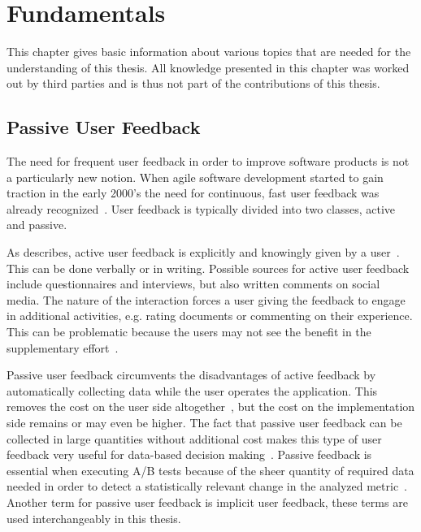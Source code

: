 %
\chapter{Fundamentals}
\label{ch:fundamentals}

This chapter gives basic information about various topics that are needed for the understanding of this thesis.
All knowledge presented in this chapter was worked out by third parties and is thus not part of the contributions of this thesis.

\section{Passive User Feedback}
\label{sec:fundamentals:implicit}

The need for frequent user feedback in order to improve software products is not a particularly new notion.
When agile software development started to gain traction in the early 2000's the need for continuous, fast user feedback was already recognized~\cite{Williams2003}.
User feedback is typically divided into two classes, active and passive.

As \citeauthor{Bosch2012} describes, active user feedback is explicitly and knowingly given by a user~\cite{Bosch2012}.
This can be done verbally or in writing.
Possible sources for active user feedback include questionnaires and interviews, but also written comments on social media.
The nature of the interaction forces a user giving the feedback to engage in additional activities, e.g. rating documents or commenting on their experience.
This can be problematic because the users may not see the benefit in the supplementary effort~\cite{Kelly:2003:IFI:959258.959260}.

Passive user feedback circumvents the disadvantages of active feedback by automatically collecting data while the user operates the application.
This removes the cost on the user side altogether~\cite{Kelly:2003:IFI:959258.959260}, but the cost on the implementation side remains or may even be higher.
The fact that passive user feedback can be collected in large quantities without additional cost makes this type of user feedback very useful for data-based decision making~\cite{Bosch2012}.
Passive feedback is essential when executing A/B tests because of the sheer quantity of required data needed in order to detect a statistically relevant change in the analyzed metric~\cite{Kohavi2009}.
Another term for passive user feedback is implicit user feedback, these terms are used interchangeably in this thesis.

